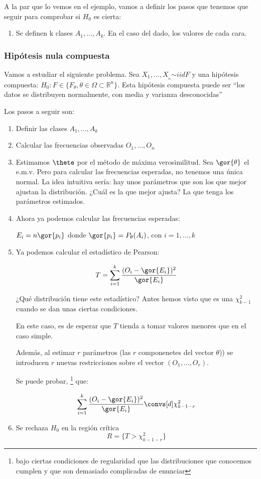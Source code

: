 A la par que lo vemos en el ejemplo, vamos a definir los pasos que tenemos que seguir para comprobar si $H_0$ es cierta:
\begin{enumerate}
\item Se definen k clases $A_1,...,A_k$. En el caso del dado, los valores de cada cara.
\end{enumerate}


\subsubsection{Hipótesis nula compuesta}

Vamos a estudiar el siguiente problema. Sea $X_1,...,X__n \overset{}{\sim}{iid}  F$ y una hipótesis compuesta: $H_0: F\in \{ F_{\theta}, \theta\in Ω \subset ℝ^n\}$. Esta hipótesis compuesta puede ser ``los datos se distribuyen normalmente, con media y varianza desconocidas''

Los pasos a seguir son: 
\begin{enumerate}
	\item Definir las clases $A_1,...,A_k$
	\item Calcular las frecuencias observadas $O_1,...,O_n$
	\item Estimamos $\thete$ por el método de máxima verosimilitud. Sea $\gor{\theta}$ el e.m.v.
	\subitem Pero para calcular las frecuencias esperadas, no tenemos una única normal. La idea intuitiva sería: hay unos parámetros que son los que mejor ajustan la distribución. ¿Cuál es la que mejor ajusta? La que tenga los parámetros estimados.
	\item Ahora ya podemos calcular las frecuencias esperadas:
	
	$E_i = n\gor{p_i}$ donde $\gor{p_i} = P_{\theta}(A_i)$, con $i=1,...,k$
	\item Ya podemos calcular el estadístico de Pearson:

	\[
	T= \sum_{i=1}^k \frac{(O_i - \gor{E_i})^2}{\gor{E_i}}
	\]

	\subitem ¿Qué distribución tiene este estadístico? Antes hemos visto que es una $\chi^2_{k-1}$ cuando se dan unas ciertas condiciones.

	En este caso, es de esperar que $T$ tienda a tomar valores menores que en el caso simple.

	Además, al estimar $r$ parámetros (las $r$ componenetes del vector $\theta$)) se introducen $r$ nuevas restricciones sobre el vector $(O_1,...,O_r)$.

Se puede probar, \footnote{bajo ciertas condiciones de regularidad que las distribuciones que conocemos cumplen y que son demasiado complicadas de enunciar} que:

\[
	\sum_{i=1}^k \frac{(O_i - \gor{E_i})^2}{\gor{E_i}} \convs[d] \chi^2_{k-1-r}
\]

	\item Se rechaza $H_0$ en  la región crítica \[R = \{ T > \chi^2_{k-1-r}\}\]
\end{enumerate}

